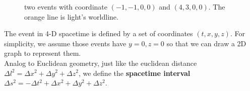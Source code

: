 \documentclass[12pt]{article}
\theoremstyle{mystyle}{\newtheorem{definition}{Definition}[subsection]}
\theoremstyle{mystyle}{\newtheorem{theorem}[definition]{Theorem}}
\theoremstyle{mystyle}{\newtheorem*{remark}{Remark}}
\theoremstyle{mystyle}{\newtheorem{example}{Example}[subsection]}
\theoremstyle{mystyle}{\newtheorem{examples}{Examples}[subsection]}
\theoremstyle{mystyle}{\newtheorem{cthm}{}[subsection]}
\begin{document}
\begin{figure}[ht]
  \begin{center}
    \caption[]{two events with coordinate $(-1, -1, 0, 0)$ and $(4, 3, 0, 0)$. The orange line is light's worldline.}
  \end{center}
\end{figure}

The event in 4-D spacetime is defined by a set of coordinates \((t, x, y, z)\).
For simplicity, we assume those events have $y=0, z=0$ so that we can draw a 2D graph to represent them.\\
Analog to Euclidean geometry, just like the euclidean distance \(\Delta l^2 = \Delta x^2 + \Delta y^2 + \Delta z^2\), we define the
\textbf{spacetime interval} $\Delta s^2 = - \Delta t^2 + \Delta x^2 + \Delta y^2 + \Delta z^2$.
\end{document}
